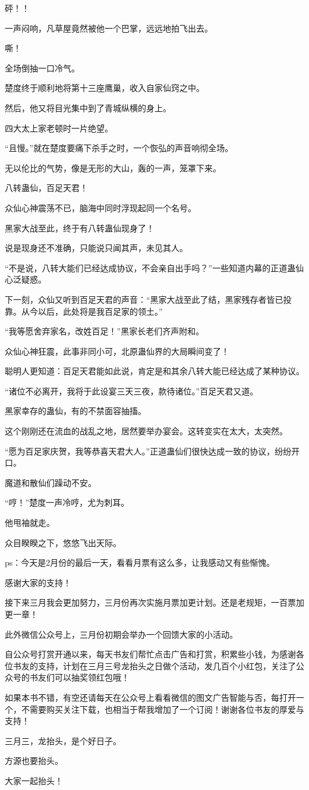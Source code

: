 \begin{this_body}
砰！！

一声闷响，凡草屋竟然被他一个巴掌，远远地拍飞出去。

嘶！

全场倒抽一口冷气。

楚度终于顺利地将第十三座鹰巢，收入自家仙窍之中。

然后，他又将目光集中到了青城纵横的身上。

四大太上家老顿时一片绝望。

“且慢。”就在楚度要痛下杀手之时，一个恢弘的声音响彻全场。

无以伦比的气势，像是无形的大山，轰的一声，笼罩下来。

八转蛊仙，百足天君！

众仙心神震荡不已，脑海中同时浮现起同一个名号。

黑家大战至此，终于有八转蛊仙现身了！

说是现身还不准确，只能说只闻其声，未见其人。

“不是说，八转大能们已经达成协议，不会亲自出手吗？”一些知道内幕的正道蛊仙心泛疑惑。

下一刻，众仙又听到百足天君的声音：“黑家大战至此了结，黑家残存者皆已投靠。从今以后，此处将是我百足家的领土。”

“我等愿舍弃家名，改姓百足！”黑家长老们齐声附和。

众仙心神狂震，此事非同小可，北原蛊仙界的大局瞬间变了！

聪明人更知道：百足天君能如此说，肯定是和其余八转大能已经达成了某种协议。

“诸位不必离开，我将于此设宴三天三夜，款待诸位。”百足天君又道。

黑家幸存的蛊仙，有的不禁面容抽搐。

这个刚刚还在流血的战乱之地，居然要举办宴会。这转变实在太大，太突然。

“愿为百足家庆贺，我等恭喜天君大人。”正道蛊仙们很快达成一致的协议，纷纷开口。

魔道和散仙们躁动不安。

“哼！”楚度一声冷哼，尤为刺耳。

他甩袖就走。

众目睽睽之下，悠悠飞出天际。

ps：今天是2月份的最后一天，看看月票有这么多，让我感动又有些惭愧。

感谢大家的支持！

接下来三月我会更加努力，三月份再次实施月票加更计划。还是老规矩，一百票加更一章！

此外微信公众号上，三月份初期会举办一个回馈大家的小活动。

自公众号打赏开通以来，每天书友们帮忙点击广告和打赏，积累些小钱，为感谢各位书友的支持，计划在三月三号龙抬头之日做个活动，发几百个小红包，关注了公众号的书友们可以抽奖领红包哦！

如果本书不错，有空还请每天在公众号上看看微信的图文广告智能与否，每打开一个，不需要购买关注下载，也相当于帮我增加了一个订阅！谢谢各位书友的厚爱与支持！

三月三，龙抬头，是个好日子。

方源也要抬头。

大家一起抬头！

\end{this_body}

